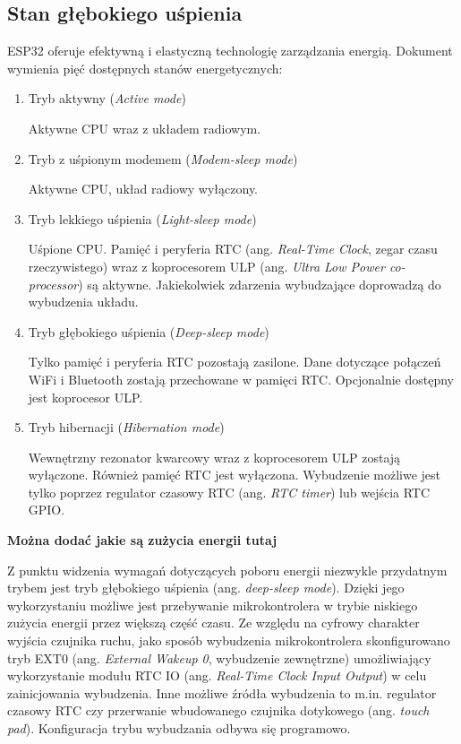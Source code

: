         \subsection{Stan głębokiego uśpienia}

            ESP32 oferuje efektywną i elastyczną technologię zarządzania energią. Dokument \cite{esp32-ds} wymienia pięć dostępnych stanów energetycznych:

            \begin{enumerate}
                \item Tryb aktywny (\textit{Active mode})

                    Aktywne CPU wraz z układem radiowym.

                \item Tryb z uśpionym modemem (\textit{Modem-sleep mode})

                    Aktywne CPU, układ radiowy wyłączony.

                \item Tryb lekkiego uśpienia (\textit{Light-sleep mode})

                    Uśpione CPU. Pamięć i peryferia RTC (ang. \textit{Real-Time Clock}, zegar czasu rzeczywistego) wraz z koprocesorem ULP (ang. \textit{Ultra Low Power co-processor}) są aktywne. Jakiekolwiek zdarzenia wybudzające doprowadzą do wybudzenia układu.

                \item Tryb głębokiego uśpienia (\textit{Deep-sleep mode})

                    Tylko pamięć i peryferia RTC pozostają zasilone. Dane dotyczące połączeń WiFi i Bluetooth zostają przechowane w pamięci RTC. Opcjonalnie dostępny jest koprocesor ULP.

                \item Tryb hibernacji (\textit{Hibernation mode})

                    Wewnętrzny rezonator kwarcowy wraz z koprocesorem ULP zostają wyłączone. Również pamięć RTC jest wyłączona. Wybudzenie możliwe jest tylko poprzez regulator czasowy RTC (ang. \textit{RTC timer}) lub wejścia RTC GPIO.

            \end{enumerate}

            \textbf{Można dodać jakie są zużycia energii tutaj}

            Z punktu widzenia wymagań dotyczących poboru energii niezwykle przydatnym trybem jest tryb głębokiego uśpienia (ang. \textit{deep-sleep mode}). Dzięki jego wykorzystaniu możliwe jest przebywanie mikrokontrolera w trybie niskiego zużycia energii przez większą część czasu. Ze względu na cyfrowy charakter wyjścia czujnika ruchu, jako sposób wybudzenia mikrokontrolera skonfigurowano tryb EXT0 (ang. \textit{External Wakeup 0}, wybudzenie zewnętrzne) umożliwiający wykorzystanie modułu RTC IO (ang. \textit{Real-Time Clock Input Output}) w celu zainicjowania wybudzenia. Inne możliwe źródła wybudzenia to m.in. regulator czasowy RTC czy przerwanie wbudowanego czujnika dotykowego (ang. \textit{touch pad}). Konfiguracja trybu wybudzania odbywa się programowo.

